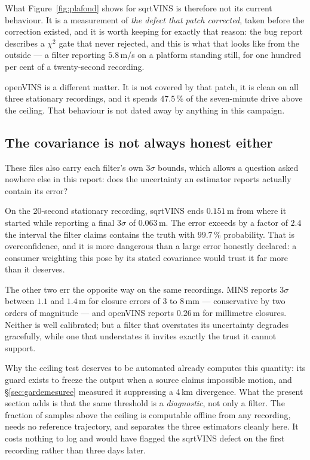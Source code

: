 What Figure~\ref{fig:plafond} shows for sqrtVINS is therefore not its
current behaviour. It is a measurement of \emph{the defect that patch
corrected}, taken before the correction existed, and it is worth keeping for
exactly that reason: the bug report describes a $\chi^2$ gate that never
rejected, and this is what that looks like from the outside --- a filter
reporting $5.8$\,m/s on a platform standing still, for one hundred per cent
of a twenty-second recording.

openVINS is a different matter. It is not covered by that patch, it is
clean on all three stationary recordings, and it spends $47.5\,\%$ of the
seven-minute drive above the ceiling. That behaviour is not dated away by
anything in this campaign.

\subsection{The covariance is not always honest either}

These files also carry each filter's own $3\sigma$ bounds, which allows a
question asked nowhere else in this report: does the uncertainty an
estimator reports actually contain its error?

On the 20-second stationary recording, sqrtVINS ends $0.151$\,m from where
it started while reporting a final $3\sigma$ of $0.063$\,m. The error
exceeds by a factor of $2.4$ the interval the filter claims contains the
truth with $99.7\,\%$ probability. That is overconfidence, and it is more
dangerous than a large error honestly declared: a consumer weighting this
pose by its stated covariance would trust it far more than it deserves.

The other two err the opposite way on the same recordings. MINS reports
$3\sigma$ between $1.1$ and $1.4$\,m for closure errors of $3$ to $8$\,mm
--- conservative by two orders of magnitude --- and openVINS reports
$0.26$\,m for millimetre closures. Neither is well calibrated; but a filter
that overstates its uncertainty degrades gracefully, while one that
understates it invites exactly the trust it cannot support.

\begin{trapbox}{Why the ceiling test deserves to be automated}
 already computes this quantity: its
 guard exists to freeze the output when a source
claims impossible motion, and \S\ref{sec:gardemesuree} measured it
suppressing a 4\,km divergence. What the present section adds is that the
same threshold is a \emph{diagnostic}, not only a filter. The fraction of
samples above the ceiling is computable offline from any recording, needs
no reference trajectory, and separates the three estimators cleanly here.
It costs nothing to log and would have flagged the sqrtVINS defect on the
first recording rather than three days later.
\end{trapbox}

